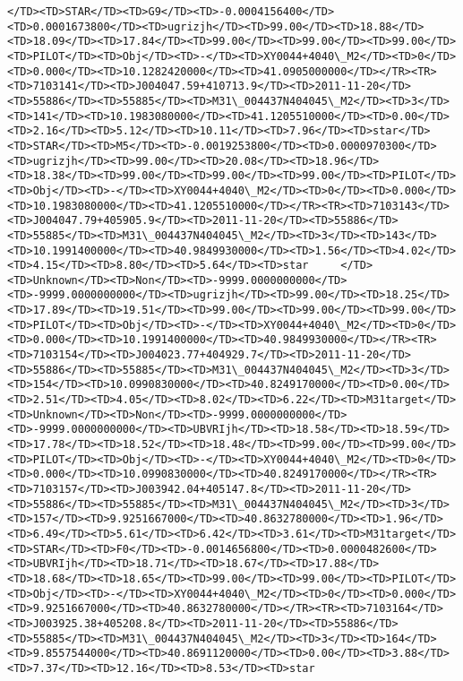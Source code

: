 \documentclass[11pt]{article}
\begin{document}
\begin{Verbatim}[commandchars=\\\{\}]
</TD><TD>STAR</TD><TD>G9</TD><TD>-0.0004156400</TD><TD>0.0001673800</TD><TD>ugrizjh</TD><TD>99.00</TD><TD>18.88</TD><TD>18.09</TD><TD>17.84</TD><TD>99.00</TD><TD>99.00</TD><TD>99.00</TD><TD>PILOT</TD><TD>Obj</TD><TD>-</TD><TD>XY0044+4040\_M2</TD><TD>0</TD><TD>0.000</TD><TD>10.1282420000</TD><TD>41.0905000000</TD></TR><TR><TD>7103141</TD><TD>J004047.59+410713.9</TD><TD>2011-11-20</TD><TD>55886</TD><TD>55885</TD><TD>M31\_004437N404045\_M2</TD><TD>3</TD><TD>141</TD><TD>10.1983080000</TD><TD>41.1205510000</TD><TD>0.00</TD><TD>2.16</TD><TD>5.12</TD><TD>10.11</TD><TD>7.96</TD><TD>star</TD><TD>STAR</TD><TD>M5</TD><TD>-0.0019253800</TD><TD>0.0000970300</TD><TD>ugrizjh</TD><TD>99.00</TD><TD>20.08</TD><TD>18.96</TD><TD>18.38</TD><TD>99.00</TD><TD>99.00</TD><TD>99.00</TD><TD>PILOT</TD><TD>Obj</TD><TD>-</TD><TD>XY0044+4040\_M2</TD><TD>0</TD><TD>0.000</TD><TD>10.1983080000</TD><TD>41.1205510000</TD></TR><TR><TD>7103143</TD><TD>J004047.79+405905.9</TD><TD>2011-11-20</TD><TD>55886</TD><TD>55885</TD><TD>M31\_004437N404045\_M2</TD><TD>3</TD><TD>143</TD><TD>10.1991400000</TD><TD>40.9849930000</TD><TD>1.56</TD><TD>4.02</TD><TD>4.15</TD><TD>8.80</TD><TD>5.64</TD><TD>star     </TD><TD>Unknown</TD><TD>Non</TD><TD>-9999.0000000000</TD><TD>-9999.0000000000</TD><TD>ugrizjh</TD><TD>99.00</TD><TD>18.25</TD><TD>17.89</TD><TD>19.51</TD><TD>99.00</TD><TD>99.00</TD><TD>99.00</TD><TD>PILOT</TD><TD>Obj</TD><TD>-</TD><TD>XY0044+4040\_M2</TD><TD>0</TD><TD>0.000</TD><TD>10.1991400000</TD><TD>40.9849930000</TD></TR><TR><TD>7103154</TD><TD>J004023.77+404929.7</TD><TD>2011-11-20</TD><TD>55886</TD><TD>55885</TD><TD>M31\_004437N404045\_M2</TD><TD>3</TD><TD>154</TD><TD>10.0990830000</TD><TD>40.8249170000</TD><TD>0.00</TD><TD>2.51</TD><TD>4.05</TD><TD>8.02</TD><TD>6.22</TD><TD>M31target</TD><TD>Unknown</TD><TD>Non</TD><TD>-9999.0000000000</TD><TD>-9999.0000000000</TD><TD>UBVRIjh</TD><TD>18.58</TD><TD>18.59</TD><TD>17.78</TD><TD>18.52</TD><TD>18.48</TD><TD>99.00</TD><TD>99.00</TD><TD>PILOT</TD><TD>Obj</TD><TD>-</TD><TD>XY0044+4040\_M2</TD><TD>0</TD><TD>0.000</TD><TD>10.0990830000</TD><TD>40.8249170000</TD></TR><TR><TD>7103157</TD><TD>J003942.04+405147.8</TD><TD>2011-11-20</TD><TD>55886</TD><TD>55885</TD><TD>M31\_004437N404045\_M2</TD><TD>3</TD><TD>157</TD><TD>9.9251667000</TD><TD>40.8632780000</TD><TD>1.96</TD><TD>6.49</TD><TD>5.61</TD><TD>6.42</TD><TD>3.61</TD><TD>M31target</TD><TD>STAR</TD><TD>F0</TD><TD>-0.0014656800</TD><TD>0.0000482600</TD><TD>UBVRIjh</TD><TD>18.71</TD><TD>18.67</TD><TD>17.88</TD><TD>18.68</TD><TD>18.65</TD><TD>99.00</TD><TD>99.00</TD><TD>PILOT</TD><TD>Obj</TD><TD>-</TD><TD>XY0044+4040\_M2</TD><TD>0</TD><TD>0.000</TD><TD>9.9251667000</TD><TD>40.8632780000</TD></TR><TR><TD>7103164</TD><TD>J003925.38+405208.8</TD><TD>2011-11-20</TD><TD>55886</TD><TD>55885</TD><TD>M31\_004437N404045\_M2</TD><TD>3</TD><TD>164</TD><TD>9.8557544000</TD><TD>40.8691120000</TD><TD>0.00</TD><TD>3.88</TD><TD>7.37</TD><TD>12.16</TD><TD>8.53</TD><TD>star     
\end{Verbatim}
\end{document}
